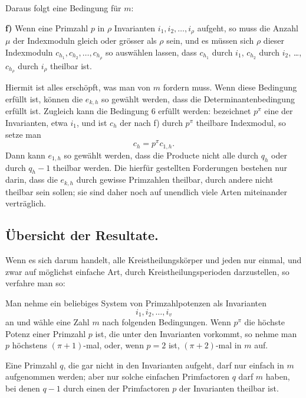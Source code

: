 \documentclass[11pt]{article}
\begin{document}
Daraus folgt eine Bedingung für $m$:

\medskip
\noindent\textbf{f)} Wenn eine Primzahl $p$ in $\rho$ Invarianten $i_1,i_2,
\ldots,i_\rho$ aufgeht, so muss die Anzahl $\mu$ der Indexmoduln gleich oder grösser als $\rho$ sein, und es müssen sich $\rho$ dieser Indexmoduln $c_{h_1},c_{h_2},
\ldots,c_{h_\rho}$ so auswählen lassen, dass $c_{h_1}$ durch $i_1$, $c_{h_2}$ durch $i_2$, \ldots, $c_{h_\rho}$ durch $i_\rho$ theilbar ist.

Hiermit ist alles erschöpft, was man von $m$ fordern muss. Wenn diese Bedingung erfüllt ist, können die $e_{k,h}$ so gewählt werden, dass die Determinantenbedingung erfüllt ist. Zugleich kann die Bedingung 6 erfüllt werden: bezeichnet $p^\pi$ eine der Invarianten, etwa $i_1$, und ist $c_h$ der nach f) durch $p^\pi$ theilbare Indexmodul, so setze man
\begin{equation}
 c_h=p^\pi c_{1,h}.
\tag{25}
\end{equation}
Dann kann $e_{1,h}$ so gewählt werden, dass die Producte nicht alle durch $q_h$ oder durch $q_h-1$ theilbar werden. Die hierfür gestellten Forderungen bestehen nur darin, dass die $e_{k,h}$ durch gewisse Primzahlen theilbar, durch andere nicht theilbar sein sollen; sie sind daher noch auf unendlich viele Arten miteinander verträglich.

\subsection*{Übersicht der Resultate.}

Wenn es sich darum handelt, alle Kreistheilungskörper und jeden nur einmal, und zwar auf möglichst einfache Art, durch Kreistheilungsperioden darzustellen, so verfahre man so:

Man nehme ein beliebiges System von Primzahlpotenzen als Invarianten
\[
 i_1,i_2,
\ldots,i_v
\]
an und wähle eine Zahl $m$ nach folgenden Bedingungen. Wenn $p^\pi$ die höchste Potenz einer Primzahl $p$ ist, die unter den Invarianten vorkommt, so nehme man $p$ höchstens $(\pi+1)$-mal, oder, wenn $p=2$ ist, $(\pi+2)$-mal in $m$ auf.

Eine Primzahl $q$, die gar nicht in den Invarianten aufgeht, darf nur einfach in $m$ aufgenommen werden; aber nur solche einfachen Primfactoren $q$ darf $m$ haben, bei denen $q-1$ durch einen der Primfactoren $p$ der Invarianten theilbar ist.
\end{document}
